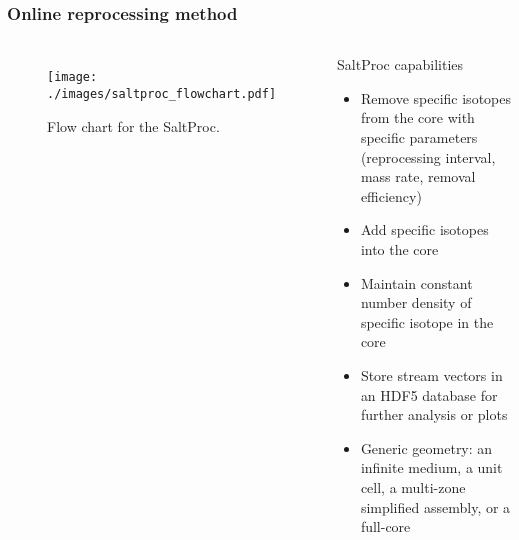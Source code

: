 \begin{frame}
\frametitle{Online reprocessing method}
  \begin{columns}
    \column[t]{6cm}
	\begin{figure}[t]
                \vspace*{-0.35in}
			\hspace{-0.3in}
                 \texttt{[image: ./images/saltproc\_flowchart.pdf]}
                \vspace*{-0.05in}
                \caption{Flow chart for the SaltProc.}
      \end{figure}

    \column[t]{6cm}
             \begin{block}{SaltProc capabilities}
               \begin{itemize}             
               \item Remove specific isotopes from the core with specific parameters (reprocessing interval, mass rate, removal efficiency)
               \item Add specific isotopes into the core
               \item Maintain constant number density of specific isotope in the core
	       \item Store stream vectors in an HDF5 database for further analysis or plots
	       \item Generic geometry: an infinite medium, a unit cell, a multi-zone simplified assembly, or a full-core
               \end{itemize}
               \end{block}
  \end{columns}
\end{frame}

